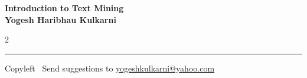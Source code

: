\documentclass[8pt,landscape]{article}
\begin{document}
\footnotesize


\begin{center}
\Large{\textbf{Introduction to Text Mining\\ Yogesh Haribhau Kulkarni}}  
\end{center}

\begin{multicols}{2}

\end{multicols}

\rule{\linewidth}{0.25pt}
\scriptsize
Copyleft \textcopyleft\  Send suggestions to 
\href{http://www.yogeshkulkarni.com}{yogeshkulkarni@yahoo.com}
\end{document}
